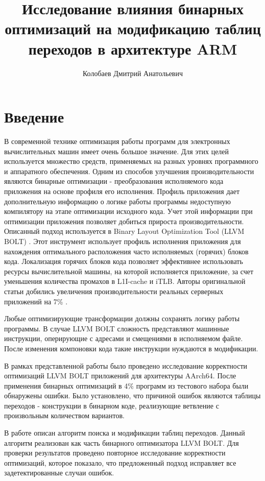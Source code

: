 \documentclass{mipt-thesis-bs}
\title{Исследование влияния бинарных оптимизаций на модификацию таблиц переходов в архитектуре ARM}
\author{Колобаев Дмитрий Анатольевич}
\begin{document}
    \frontmatter
    \titlecontents

    \mainmatter

    \chapter{Введение}
    В современной технике оптимизация работы программ для электронных вычислительных машин имеет очень большое значение.
    Для этих целей используется множество средств, применяемых на разных уровнях программного и аппаратного обеспечения.
    Одним из способов улучшения производительности являются бинарные оптимизации - преобразования исполняемого кода приложения на основе профиля его исполнения\cite{lisitsyn-disser}.
    Профиль приложения дает дополнительную информацию о логике работы программы недоступную компилятору на этапе оптимизации исходного кода.
    Учет этой информации при оптимизации приложения позволяет добиться прироста производительности.
    Описанный подход используется в Binary Layout Optimization Tool (LLVM BOLT) \cite{boltorig}.
    Этот инструмент использует профиль исполнения приложения для нахождения оптимального расположения часто исполняемых (горячих) блоков кода.
    Локализация горячих блоков кода позволяет эффективнее использовать ресурсы вычислительной машины, на которой исполняется приложение, за счет уменьшения количества промахов в L1I-cache и iTLB.
    Авторы оригинальной статьи добились увеличения производительности реальных серверных приложений на 7\% \cite{boltorig}.

    Любые оптимизирующие трансформации должны сохранять логику работы программы. В случае LLVM BOLT сложность представляют машинные инструкции, оперирующие с адресами и смещениями в исполняемом файле. После изменения компоновки кода такие инструкции нуждаются в модификации.

    В рамках представленной работы было проведено исследование корректности оптимизаций LLVM BOLT приложений для архитектуры AArch64.
    После применения бинарных оптимизаций в 4\% программ из тестового набора были обнаружены ошибки.
    Было установлено, что причиной ошибок являются таблицы переходов - конструкции в бинарном коде, реализующие ветвление с произвольным количеством вариантов.

    В работе описан алгоритм поиска и модификации таблиц переходов.
    Данный алгоритм реализован как часть бинарного оптимизатора LLVM BOLT.
    Для проверки результатов проведено повторное исследование корректности оптимизаций, которое показало, что предложенный подход исправляет все задетектированные случаи ошибок.
\end{document}
